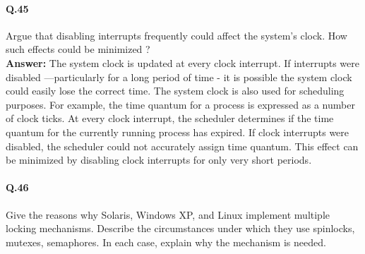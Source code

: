 \documentclass[a4paper,10pt]{article}
\begin{document}
\paragraph{Q.45}
Argue that disabling interrupts frequently could
affect the system’s clock. How such effects
could be minimized ? \\
\textbf{Answer:} The system clock is updated at every clock interrupt. If
interrupts were disabled —particularly for a long period of time - it is
possible the system clock could easily lose the correct time. The system clock
is also used for scheduling purposes. For example, the time
quantum for a process is expressed as a number of clock ticks. At every
clock interrupt, the scheduler determines if the time quantum for the
currently running process has expired. If clock interrupts were disabled,
the scheduler could not accurately assign time quantum. This effect can
be minimized by disabling clock interrupts for only very short periods.

\paragraph{Q.46}
Give the reasons why Solaris, Windows XP, and Linux implement multiple locking
mechanisms. Describe the circumstances under which they
use spinlocks, mutexes, semaphores.
In each case, explain why the mechanism is needed.
\end{document}
